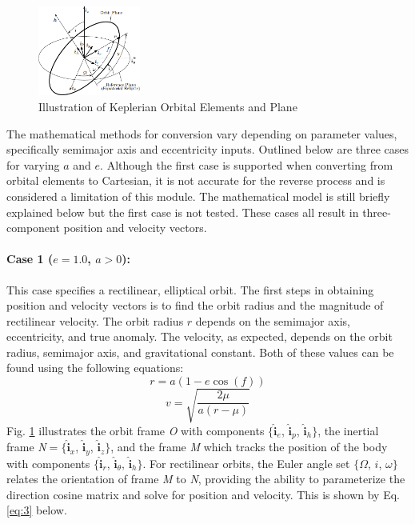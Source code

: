 \begin{figure}[ht]
	\centering
	\captionsetup{justification=centering}
	\includegraphics[width=0.3\textwidth]{Figures/orb_elem.png}
	\caption{Illustration of Keplerian Orbital Elements and Plane}\label{fig:OrbElem}
\end{figure} 
The mathematical methods for conversion vary depending on parameter values, specifically semimajor axis and eccentricity inputs. Outlined below are three cases for varying $a$ and $e$. Although the first case is supported when converting from orbital elements to Cartesian, it is not accurate for the reverse process and is considered a limitation of this module. The mathematical model is still briefly explained below but the first case is not tested. These cases all result in three-component position and velocity vectors.
\paragraph{Case 1 (\boldmath$e=1.0$, $a>0$):}
This case specifies a rectilinear, elliptical orbit. The first steps in obtaining position and velocity vectors is to find the orbit radius and the magnitude of rectilinear velocity. The orbit radius $r$ depends on the semimajor axis, eccentricity, and true anomaly. The velocity, as expected, depends on the orbit radius, semimajor axis, and gravitational constant. Both of these values can be found using the following equations:
\begin{equation}
r = a( 1-e \cos(f))
\end{equation}
\begin{equation}
v=\sqrt{\frac{2 \mu}{a(r-\mu)}}
\end{equation}
Fig. \ref{fig:OrbElem} illustrates the orbit frame \textit{O} with components $\{\bm{\hat{i}}_e$, $\bm{\hat{i}}_p$, $\bm{\hat{i}}_h\}$, the inertial frame \textit{N}$=\{\bm{\hat{i}}_x$, $\bm{\hat{i}}_y$, $\bm{\hat{i}}_z\}$, and the frame \textit{M} which tracks the position of the body with components $\{\bm{\hat{i}}_r$, $\bm{\hat{i}}_\theta$, $\bm{\hat{i}}_h\}$. For rectilinear orbits, the Euler angle set $\{\Omega$, $i$, $\omega\}$ relates the orientation of frame \textit{M} to \textit{N}, providing the ability to parameterize the direction cosine matrix and solve for position and velocity. This is shown by Eq. \ref{eq:3} below.

